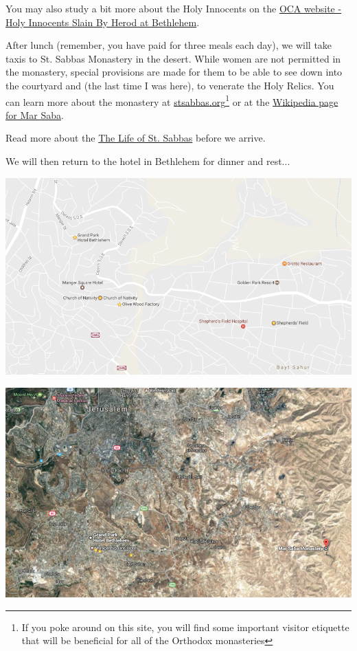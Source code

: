 \documentclass[letterpaper]{report}
\begin{document}
You may also study a bit more about the Holy Innocents on the
\href{https://oca.org/saints/lives/2007/12/29/103682-14000-infants-the-holy-innocents-slain-by-herod-at-bethlehem}{
    OCA website - Holy Innocents Slain By Herod at Bethlehem}. 

After lunch (remember, you have paid for three meals each day),
we will take taxis to St. Sabbas Monastery in the desert.
While women are not permitted in the monastery,
special provisions are made for them to be able to see down into the courtyard 
and (the last time I was here),
to venerate the Holy Relics. You can learn more about the monastery at
\href{http://stsabbas.org/jerusalem.html}{stsabbas.org}\footnote{If you poke 
    around on this site,
    you will find some important visitor etiquette that will 
    be beneficial for all of the Orthodox monasteries}
or at the \href{https://en.wikipedia.org/wiki/Mar_Saba}{
    Wikipedia page for Mar Saba}.

Read more about the 
\href{https://oca.org/saints/lives/2008/12/05/103477-venerable-sava-the-sanctified}{
	The Life of St. Sabbas} before we arrive.

We will then return to the hotel in Bethlehem for dinner and rest...

\includegraphics[width=\textwidth]{BethlehemSites}

\includegraphics[width=\textwidth]{MarSabaMonastery}
\end{document}
